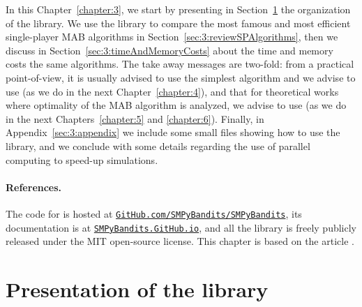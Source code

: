 In this Chapter~\ref{chapter:3}, we start by presenting in Section~\ref{sec:3:presentationLibrary} the organization of the library.
We use the library to compare the most famous and most efficient single-player MAB algorithms in Section~\ref{sec:3:reviewSPAlgorithms},
then we discuss in Section~\ref{sec:3:timeAndMemoryCosts} about the time and memory costs the same algorithms.
The take away messages are two-fold:
from a practical point-of-view, it is usually advised to use the simplest algorithm and we advise to use \UCB{} (as we do in the next Chapter~\ref{chapter:4}),
and that for theoretical works where optimality of the MAB algorithm is analyzed, we advise to use \klUCB{} (as we do in the next Chapters~\ref{chapter:5} and \ref{chapter:6}).
%
Finally, in Appendix~\ref{sec:3:appendix} we include some small files showing how to use the library, and we conclude with some details regarding the use of parallel computing to speed-up simulations.


\paragraph{References.}
%
The code for \SMPyBandits{} is hosted at \texttt{\href{https://GitHub.com/SMPyBandits/SMPyBandits/}{GitHub.com/SMPyBandits/SMPyBandits}}, its documentation is at \texttt{\href{https://SMPyBandits.GitHub.io/}{SMPyBandits.GitHub.io}}, and all the library is freely publicly released under the MIT open-source license.
This chapter is based on the article \cite{SMPyBanditsJMLR}.


\section{Presentation of the library}
\label{sec:3:presentationLibrary}


